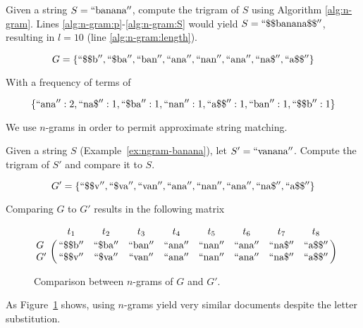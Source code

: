 		\begin{ex}
		\label{ex:ngram-banana}
			Given a string $S = \mathrm{``banana''}$, compute the trigram of $S$ using Algorithm \ref{alg:n-gram}.  Lines \ref{alg:n-gram:p}-\ref{alg:n-gram:S} would yield $S = \mathrm{``\char"24\char"24banana\char"24\char"24''}$, resulting in $l = 10$ (line \ref{alg:n-gram:length}).
			
			$$
				G = \left\{
					\mathrm{``\char"24\char"24b''},
					\mathrm{``\char"24ba''},
					\mathrm{``ban''},
					\mathrm{``ana''},
					\mathrm{``nan''},
					\mathrm{``ana''},
					\mathrm{``na\char"24''},
					\mathrm{``a\char"24\char"24''}
				\right\}
			$$
			
			With a frequency of terms of
			
			$$\left\{\mathrm{``ana''}: 2, \mathrm{``na\char"24''}: 1, \mathrm{``\char"24ba''}: 1, \mathrm{``nan''}: 1, \mathrm{``a\char"24\char"24''}: 1, \mathrm{``ban''}: 1, \mathrm{``\char"24\char"24b''}: 1\right\}$$
		\end{ex}
		
		We use $n$-grams in order to permit approximate string matching.
		
		\begin{ex}
		\label{ex:n-gram-comparison}
			Given a string $S$ (Example~\ref{ex:ngram-banana}), let $S' = \mathrm{``vanana''}$.  Compute the trigram of $S'$ and compare it to $S$.
			
			$$
				G' = \left\{
					\mathrm{``\char"24\char"24v''},
					\mathrm{``\char"24va''},
					\mathrm{``van''},
					\mathrm{``ana''},
					\mathrm{``nan''},
					\mathrm{``ana''},
					\mathrm{``na\char"24''},
					\mathrm{``a\char"24\char"24''}
				\right\}
			$$
			
			Comparing $G$ to $G'$ results in the following matrix
			
			\begin{figure}[!ht]
				$$
					\bordermatrix{
					~ & t_1 & t_2 & t_3 & t_4 & t_5 & t_6 & t_7 & t_8 \cr
					G & \mathrm{``\char"24\char"24b''} & \mathrm{``\char"24ba''} & \mathrm{``ban''} & \mathrm{``ana''} & \mathrm{``nan''} & \mathrm{``ana''} & \mathrm{``na\char"24''} & \mathrm{``a\char"24\char"24''} \cr
					G' & \mathrm{``\char"24\char"24v''} & \mathrm{``\char"24va''} & \mathrm{``van''} & \mathrm{``ana''} & \mathrm{``nan''} & \mathrm{``ana''} & \mathrm{``na\char"24''} & \mathrm{``a\char"24\char"24''} \cr
					}
				$$
				
				\caption{Comparison between $n$-grams of $G$ and $G'$.}
				\label{fig:n-gram-misspelling-comparison}
			\end{figure}
			
			As Figure~\ref{fig:n-gram-misspelling-comparison} shows, using $n$-grams yield very similar documents despite the letter substitution.
		\end{ex}
			
